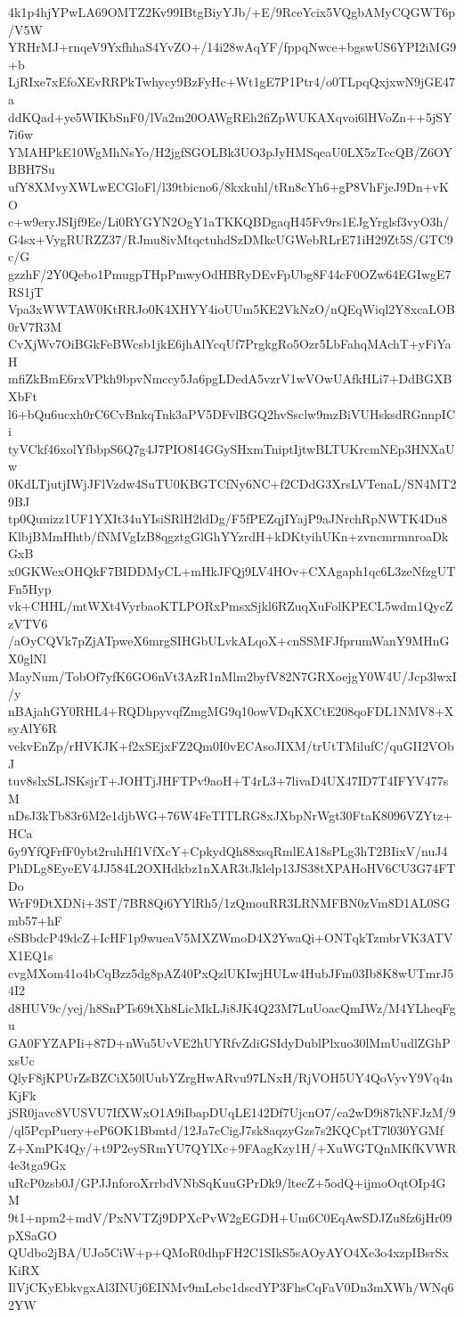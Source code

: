 4k1p4hjYPwLA69OMTZ2Kv99IBtgBiyYJb/+E/9RceYcix5VQgbAMyCQGWT6p/V5W
YRHrMJ+rnqeV9YxfhhaS4YvZO+/14i28wAqYF/fppqNwce+bgswUS6YPI2iMG9+b
LjRIxe7xEfoXEvRRPkTwhycy9BzFyHc+Wt1gE7P1Ptr4/o0TLpqQxjxwN9jGE47a
ddKQad+ye5WIKbSnF0/lVa2m20OAWgREh2fiZpWUKAXqvoi6lHVoZn++5jSY7i6w
YMAHPkE10WgMhNsYo/H2jgfSGOLBk3UO3pJyHMSqeaU0LX5zTccQB/Z6OYBBH7Su
ufY8XMvyXWLwECGloFl/l39tbicno6/8kxkuhl/tRn8cYh6+gP8VhFjeJ9Dn+vKO
c+w9eryJSIjf9Ee/Li0RYGYN2OgY1aTKKQBDgaqH45Fv9rs1EJgYrglsf3vyO3h/
G4sx+VygRURZZ37/RJmu8ivMtqctuhdSzDMkcUGWebRLrE71iH29Zt5S/GTC9c/G
gzzhF/2Y0Qebo1PmugpTHpPmwyOdHBRyDEvFpUbg8F44cF0OZw64EGIwgE7RS1jT
Vpa3xWWTAW0KtRRJo0K4XHYY4ioUUm5KE2VkNzO/nQEqWiql2Y8xcaLOB0rV7R3M
CvXjWv7OiBGkFeBWcsb1jkE6jhAlYcqUf7PrgkgRo5Ozr5LbFahqMAchT+yFiYaH
mfiZkBmE6rxVPkh9bpvNmccy5Ja6pgLDedA5vzrV1wVOwUAfkHLi7+DdBGXBXbFt
l6+bQu6ucxh0rC6CvBnkqTnk3aPV5DFvlBGQ2hvSsclw9mzBiVUHsksdRGnnpICi
tyVCkf46xolYfbbpS6Q7g4J7PIO8I4GGySHxmTniptIjtwBLTUKrcmNEp3HNXaUw
0KdLTjutjIWjJFlVzdw4SuTU0KBGTCfNy6NC+f2CDdG3XrsLVTenaL/SN4MT29BJ
tp0Qunizz1UF1YXIt34uYIsiSRlH2ldDg/F5fPEZqjIYajP9aJNrchRpNWTK4Du8
KlbjBMmHhtb/fNMVgIzB8qgztgGlGhYYzrdH+kDKtyihUKn+zvncmrmnroaDkGxB
x0GKWexOHQkF7BIDDMyCL+mHkJFQj9LV4HOv+CXAgaph1qc6L3zeNfzgUTFn5Hyp
vk+CHHL/mtWXt4VyrbaoKTLPORxPmsxSjkl6RZuqXuFolKPECL5wdm1QycZzVTV6
/aOyCQVk7pZjATpweX6mrgSIHGbULvkALqoX+cnSSMFJfprumWanY9MHnGX0glNl
MayNum/TobOf7yfK6GO6nVt3AzR1nMlm2byfV82N7GRXoejgY0W4U/Jcp3lwxI/y
nBAjahGY0RHL4+RQDhpyvqfZmgMG9q10owVDqKXCtE208qoFDL1NMV8+XsyAlY6R
vekvEnZp/rHVKJK+f2xSEjxFZ2Qm0I0vECAsoJIXM/trUtTMilufC/quGII2VObJ
tuv8slxSLJSKsjrT+JOHTjJHFTPv9aoH+T4rL3+7livaD4UX47ID7T4IFYV477sM
nDsJ3kTb83r6M2e1djbWG+76W4FeTITLRG8xJXbpNrWgt30FtaK8096VZYtz+HCa
6y9YfQFrfF0ybt2ruhHf1VfXcY+CpkydQh88xsqRmlEA18sPLg3hT2BIixV/nuJ4
PhDLg8EyeEV4JJ584L2OXHdkbz1nXAR3tJklelp13JS38tXPAHoHV6CU3G74FTDo
WrF9DtXDNi+3ST/7BR8Qi6YYlRh5/1zQmouRR3LRNMFBN0zVm8D1AL0SGmb57+hF
eSBbdcP49dcZ+IcHF1p9wueaV5MXZWmoD4X2YwaQi+ONTqkTzmbrVK3ATVX1EQ1s
cvgMXom41o4bCqBzz5dg8pAZ40PxQzlUKIwjHULw4HubJFm03Ib8K8wUTmrJ54I2
d8HUV9c/yej/h8SnPTs69tXh8LicMkLJi8JK4Q23M7LuUoacQmIWz/M4YLheqFgu
GA0FYZAPIi+87D+nWu5UvVE2hUYRfvZdiGSIdyDublPlxuo30lMmUudlZGhPxsUc
QlyF8jKPUrZsBZCiX50lUubYZrgHwARvu97LNxH/RjVOH5UY4QoVyvY9Vq4nKjFk
jSR0javc8VUSVU7IfXWxO1A9iIbapDUqLE142Df7UjcnO7/ca2wD9i87kNFJzM/9
/ql5PcpPuery+eP6OK1Bbmtd/12Ja7cCigJ7sk8aqzyGzs7s2KQCptT7l030YGMf
Z+XmPK4Qy/+t9P2eySRmYU7QYlXc+9FAagKzy1H/+XuWGTQnMKfKVWR4e3tga9Gx
uRcP0zsb0J/GPJJnforoXrrbdVNbSqKuuGPrDk9/ltecZ+5odQ+ijmoOqtOIp4GM
9t1+npm2+mdV/PxNVTZj9DPXcPvW2gEGDH+Um6C0EqAwSDJZu8fz6jHr09pXSaGO
QUdbo2jBA/UJo5CiW+p+QMoR0dhpFH2C1SIkS5sAOyAYO4Xe3o4xzpIBsrSxKiRX
IlVjCKyEbkvgxAl3INUj6EINMv9mLebc1dscdYP3FhsCqFaV0Dn3mXWh/WNq62YW
